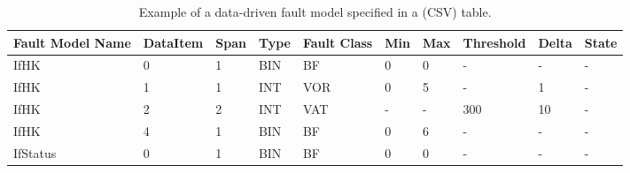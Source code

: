 \begin{table}[h]
\begin{center}
\small
\begin{tabular}{|p{1cm}|p{1.6cm}|p{1cm}|p{1cm}|p{1cm}|p{1cm}|p{1cm}|p{1.6cm}|p{1cm}|p{1cm}|}
\hline
\textbf{Fault Model Name}&\textbf{DataItem}&\textbf{Span}&\textbf{Type}&\textbf{Fault Class}&\textbf{Min}&\textbf{Max}&\textbf{Threshold}&\textbf{Delta}&\textbf{State}\\
\hline
IfHK&0&1&BIN&BF&0&0&-&-&-\\
IfHK&1&1&INT&VOR&0&5&-&1&-\\
IfHK&2&2&INT&VAT&-&-&300&10&-\\
IfHK&4&1&BIN&BF&0&6&-&-&-\\
\hline
IfStatus&0&1&BIN&BF&0&0&-&-&-\\
\hline
\end{tabular}
\end{center}
\caption{Example of a data-driven fault model specified in a (CSV) table.}
\label{table:faultModel:example}
\end{table}%